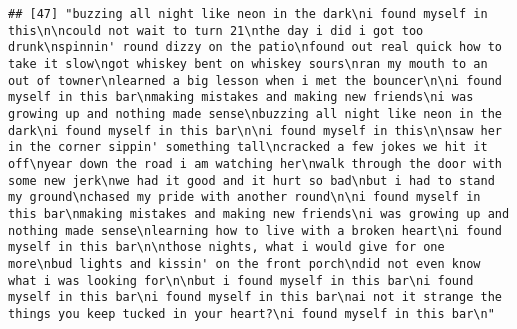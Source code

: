 \documentclass[]{article}
\begin{document}
\begin{verbatim}
## [47] "buzzing all night like neon in the dark\ni found myself in this\n\ncould not wait to turn 21\nthe day i did i got too drunk\nspinnin' round dizzy on the patio\nfound out real quick how to take it slow\ngot whiskey bent on whiskey sours\nran my mouth to an out of towner\nlearned a big lesson when i met the bouncer\n\ni found myself in this bar\nmaking mistakes and making new friends\ni was growing up and nothing made sense\nbuzzing all night like neon in the dark\ni found myself in this bar\n\ni found myself in this\n\nsaw her in the corner sippin' something tall\ncracked a few jokes we hit it off\nyear down the road i am watching her\nwalk through the door with some new jerk\nwe had it good and it hurt so bad\nbut i had to stand my ground\nchased my pride with another round\n\ni found myself in this bar\nmaking mistakes and making new friends\ni was growing up and nothing made sense\nlearning how to live with a broken heart\ni found myself in this bar\n\nthose nights, what i would give for one more\nbud lights and kissin' on the front porch\ndid not even know what i was looking for\n\nbut i found myself in this bar\ni found myself in this bar\ni found myself in this bar\nai not it strange the things you keep tucked in your heart?\ni found myself in this bar\n"                                                                                                                                                                                                                                                                                                                                                                                                                                                                                                                                                                                                                                                                                                                                                                                                                                                                                                                                                                                                                                                                                                                                                                                                                                                                                                                                                                                                                                                                                                                                                                                                                                                  

\end{verbatim}
\end{document}
